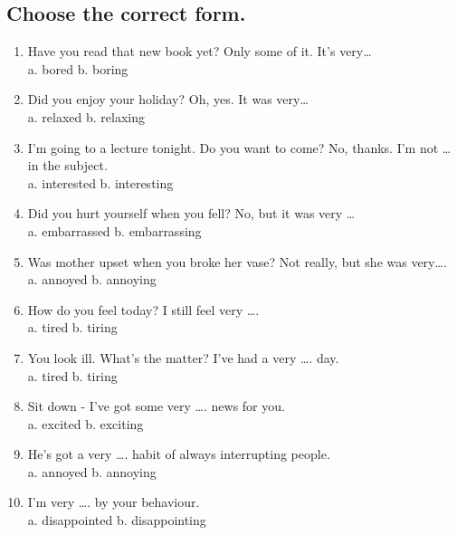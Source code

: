 \subsection*{Choose the correct form.}
\begin{enumerate}
      \item {} Have you read that new book yet?  Only some of it. It’s very…\\
            a. bored \quad b. boring

      \item {} Did you enjoy your holiday?  Oh, yes. It was very…\\
            a. relaxed \quad b. relaxing

      \item {} I'm going to a lecture tonight. Do you want to come?  No, thanks. I'm not … in the subject.\\
            a. interested \quad b. interesting

      \item {} Did you hurt yourself when you fell?  No, but it was very …\\
            a. embarrassed \quad b. embarrassing

      \item {} Was mother upset when you broke her vase?  Not really, but she was very….\\
            a. annoyed \quad b. annoying

      \item {} How do you feel today?  I still feel very ….\\
            a. tired \quad b. tiring

      \item {} You look ill. What’s the matter?  I’ve had a very …. day.\\
            a. tired \quad b. tiring

      \item Sit down - I've got some very …. news for you.\\
            a. excited \quad b. exciting

      \item He's got a very …. habit of always interrupting people.\\
            a. annoyed \quad b. annoying

      \item I'm very …. by your behaviour.\\
            a. disappointed \quad b. disappointing
\end{enumerate}

